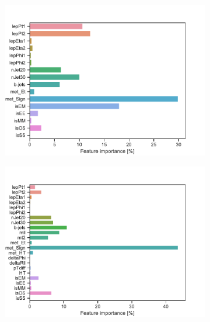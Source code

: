 \begin{figure}[H]
    \centering
    \begin{subfigure}[t!]{0.49\textwidth}
        \includegraphics[width = \textwidth]{Figures/SlepSlep/ML/BDT/Low_level/Inter/featureImportance.pdf}
        \caption{}
        \label{fig:traintestscaled}
    \end{subfigure}
    \begin{subfigure}[t!]{0.49\textwidth}
        \includegraphics[width = \textwidth]{Figures/SlepSnu/BDT/All_level/Inter/featureImportance.pdf}
        \caption{}
        \label{fig:ROCBDTLow_low_level}
    \end{subfigure}
    \begin{subfigure}[t!]{0.49\textwidth}

\end{subfigure}
\end{figure}
